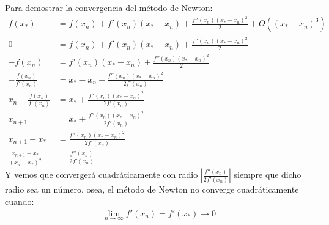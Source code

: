 \documentclass[spanish, fleqn]{article}
\begin{document}
Para demostrar la convergencia del método de Newton:
\begin{align*}
f(x_*) &= f(x_n)+f'(x_n)(x_*-x_n)+\frac{f''(x_n)(x_*-x_n)^2}{2}+O((x_*-x_n)^3)
\\0 &= f(x_n)+f'(x_n)(x_*-x_n)+\frac{f''(x_n)(x_*-x_n)^2}{2}
\\-f(x_n) &= f'(x_n)(x_*-x_n)+\frac{f''(x_n)(x_*-x_n)^2}{2}
\\-\frac{f(x_n)}{f'(x_n)} &= x_*-x_n+\frac{f''(x_n)(x_*-x_n)^2}{2f'(x_n)}
\\x_n-\frac{f(x_n)}{f'(x_n)} &= x_*+\frac{f''(x_n)(x_*-x_n)^2}{2f'(x_n)}
\\x_{n+1} &= x_*+\frac{f''(x_n)(x_*-x_n)^2}{2f'(x_n)}
\\x_{n+1}-x_* &= \frac{f''(x_n)(x_*-x_n)^2}{2f'(x_n)}
\\\frac{x_{n+1}-x_*}{(x_n-x_*)^2} &= \frac{f''(x_n)}{2f'(x_n)}
\end{align*}
Y vemos que convergerá cuadráticamente con radio $\left| \frac{f''(x_n)}{2f'(x_n)} \right|$ siempre que dicho radio sea un número, osea, el método de Newton no converge cuadráticamente cuando:
\begin{align*}
\lim_{n\rightarrow \infty} f'(x_n)= f'(x_*) \rightarrow 0
\end{align*}
\end{document}
